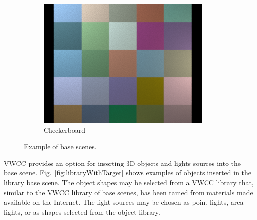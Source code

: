 \documentclass{jov}
\begin{document}
\begin{figure}[t]
\begin{subfigure}[b]{0.22 \textwidth}
        \includegraphics[width=\textwidth]{../Figures/Figure9/Figure9_f.png}
        \caption{Checkerboard}
        \label{fig:baseSceneCheckerBoard}
    \end{subfigure}
    \caption{Example of base scenes.}\label{fig:baseScenes}
\end{figure}

VWCC provides an option for inserting 3D objects and lights sources into the base scene. Fig.~\ref{fig:libraryWithTarget} shows examples of objects inserted in the library base scene. The object shapes may be selected from a VWCC library that, similar to the VWCC library of base scenes, has been tamed from materials made available on the Internet. The light sources may be chosen as point lights, area lights, or as shapes selected from the object library.
\end{document}
